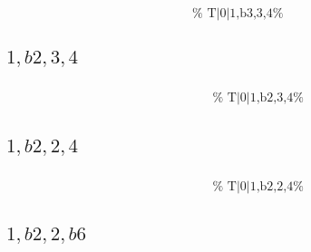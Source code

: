 \documentclass[english]{./gbook}
\begin{document}
\begin{large}
\[\begin{array}{ll}
&
	\text{
	}
\end{array}
\]

\subsection*{$1,b2,3,4$}
\[
\begin{array}{ll}
	\begin{array}{c}
		\begin{array}{ccc}
			&%
			&%
		\end{array}
		\\
		\begin{array}{cc}
			&%
		\end{array}
	\end{array}

&
	\text{
	}
\end{array}
\]

\subsection*{$1,b2,2,4$}
\[
\begin{array}{ll}
	\begin{array}{c}
		\begin{array}{ccc}
			&%
			&%
		\end{array}
		\\
		\begin{array}{cc}
			&%
		\end{array}
	\end{array}

&
	\text{
	}
\end{array}
\]

\subsection*{$1,b2,2,b6$}
\[
\begin{array}{ll}
	\begin{array}{c}
		\begin{array}{ccc}
			&%
			&%
		\end{array}
		\\
		\begin{array}{cc}
			&%
		\end{array}
	\end{array}


\end{array}\]
\end{large}
\end{document}

